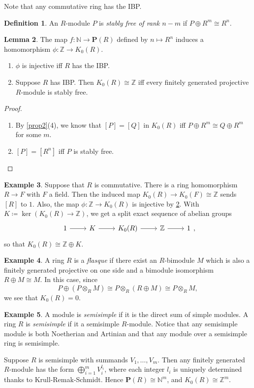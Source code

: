 \documentclass[10pt,letterpaper,cm]{nupset}
\theoremstyle{definition}
\newtheorem{definition}{Definition}[section]
\newtheorem{exmp}[definition]{Example}
\theoremstyle{theorem}
\newtheorem{lemma}[definition]{Lemma}
\theoremstyle{remark}
\newcommand{\N}{\mathbb N}
\renewcommand{\P}{\mathbf P}
\newcommand{\Z}{\mathbb Z}
\newcommand{\1}{\mathbf{1}}
\newcommand{\0}{\vec 0}
\begin{document}
Note that any commutative ring has the IBP.

\begin{definition}
An $R$-module $P$ is \textit{stably free of rank $n-m$} if $P \oplus R^m \cong R^n$.
\end{definition}

\begin{lemma}\label{L4}
The map $f: \N \to \P(R)$ defined by $n \mapsto R^n$ induces a homomorphism $\phi : \Z \to K_0(R)$.
\begin{enumerate}
\item $\phi$ is injective iff $R$ has the IBP.
\item Suppose $R$ has IBP. Then $K_0(R) \cong \Z$ iff every finitely generated projective $R$-module is stably free.
\end{enumerate}
\end{lemma}
\begin{proof} $ $
\begin{enumerate}
\item By \cref{prop2}(4), we know that $[P] = [Q]$ in $K_0(R)$ iff $P\oplus R^m \cong Q\oplus R^m$ for some $m$. 
\item $[P]= \left[R^n\right]$ iff $P$ is stably free.
\end{enumerate}
\end{proof}


\begin{exmp}
Suppose that $R$ is commutative. There is a ring homomorphism $R\to F$ with $F$ a field. Then the induced map $K_0(R) \to K_0(F) \cong \Z$ sends $[R]$ to $1$. Also, the map $\phi : \Z \to K_0(R)$ is injective by \cref{L4}. With $K\coloneqq \ker(K_0(R) \to \Z)$, we get a split exact sequence of abelian groups
\[
\begin{tikzcd}
1 \arrow[r] & K \arrow[r] & K_0(R) \arrow[r] & \mathbb Z \arrow[r] & 1
\end{tikzcd},
\]
so that $K_0(R) \cong \Z \oplus K$.
\end{exmp}

\begin{exmp}
A ring $R$ is a \textit{flasque} if there exist an $R$-bimodule $M$ which is also a finitely generated projective on one side and a bimodule isomorphism $R\oplus M \cong M$. In this case, since $$P \oplus \left(P \otimes_R M\right) \cong P \otimes_R \left(R \oplus M\right) \cong P \otimes_R M,$$ we see that $K_0(R) =0$.
\end{exmp}

\begin{exmp}
A module is \textit{semisimple} if it is the direct sum of simple modules. A ring $R$ is  \textit{semisimple} if it a semisimple $R$-module. Notice that any semisimple module is both Noetherian and Artinian and that any module over a semisimple ring is semisimple. 

 Suppose $R$ is semisimple with summands $V_1, \ldots, V_m$. Then any finitely generated $R$-module has the form $\bigoplus_{i=1}^m V_i^{l_i}$, where each integer $l_i$ is uniquely determined thanks to Krull-Remak-Schmidt. Hence $\P(R) \cong \N^m$, and $K_0(R) \cong \Z^m$.
\end{exmp}
\end{document}

